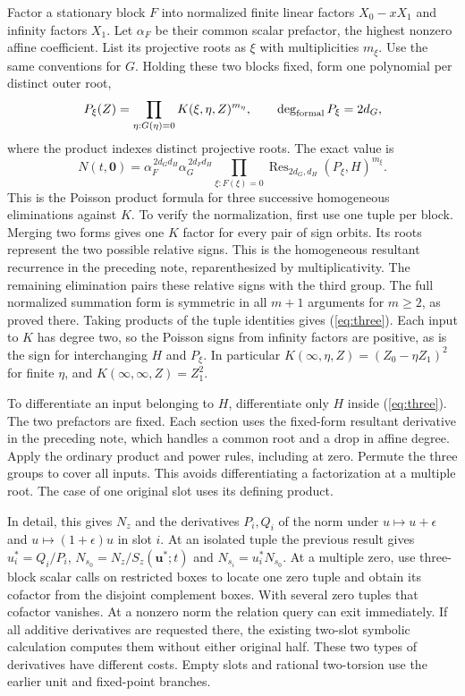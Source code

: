\documentclass[11pt]{article}
\newcommand{\Res}{\operatorname{Res}}
\begin{document}
Factor a stationary block $F$ into normalized finite linear factors
$X_0-xX_1$ and infinity factors $X_1$. Let $\alpha_F$ be their
common scalar prefactor, the highest nonzero affine coefficient.
List its projective roots as $\xi$ with multiplicities $m_\xi$.
Use the same conventions for $G$. Holding these two blocks fixed, form
one polynomial per distinct outer root,
\[
 P_\xi(Z)=\prod_{\eta:G(\eta)=0}K(\xi,\eta,Z)^{m_\eta},
                  \qquad \deg_{\rm formal}P_\xi=2d_G ,
\]
where the product indexes distinct projective roots. The exact value is
\begin{equation}
 N(t,\mathbf0)=
 \alpha_F^{\,2d_Gd_H}\alpha_G^{\,2d_Fd_H}
       \prod_{\xi:F(\xi)=0}
       \Res_{2d_G,d_H}(P_\xi,H)^{m_\xi}.             \label{eq:three}
\end{equation}
This is the Poisson product formula for three successive homogeneous
eliminations against $K$. To verify the normalization, first use
one tuple per block. Merging two forms gives one $K$ factor for
every pair of sign orbits. Its roots represent the two possible
relative signs. This is the homogeneous resultant recurrence in
the preceding note, reparenthesized by multiplicativity. The
remaining elimination pairs these relative signs with the third
group. The full normalized summation form is symmetric in all
$m+1$ arguments for $m\ge2$, as proved there. Taking products of
the tuple identities gives (\ref{eq:three}). Each input to $K$
has degree two, so the Poisson signs from infinity factors are
positive, as is the sign for interchanging $H$ and $P_\xi$.
In particular $K(\infty,\eta,Z)=(Z_0-\eta Z_1)^2$ for finite
$\eta$, and $K(\infty,\infty,Z)=Z_1^2$.

To differentiate an input belonging to $H$, differentiate only
$H$ inside (\ref{eq:three}). The two prefactors are fixed.
Each section uses the fixed-form resultant derivative in the
preceding note, which handles a common root and a drop in affine
degree. Apply the ordinary product and power rules, including at
zero. Permute the three groups to cover all inputs. This avoids
differentiating a factorization at a multiple root. The case of
one original slot uses its defining product.

In detail, this gives $N_z$ and the derivatives $P_i,Q_i$ of the
norm under $u\mapsto u+\epsilon$ and $u\mapsto(1+\epsilon)u$ in
slot $i$. At an isolated tuple the previous result gives
$u_i^*=Q_i/P_i$, $N_{s_0}=N_z/S_z(\mathbf u^*;t)$ and
$N_{s_i}=u_i^*N_{s_0}$. At a multiple zero, use three-block
scalar calls on restricted boxes to locate one zero tuple and
obtain its cofactor from the disjoint complement boxes. With
several zero tuples that cofactor vanishes. At a nonzero norm the
relation query can exit immediately. If all additive derivatives
are requested there, the existing two-slot symbolic calculation
computes them without either original half. These two types of
derivatives have different costs. Empty slots and rational
two-torsion use the earlier unit and fixed-point branches.
\end{document}
